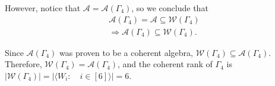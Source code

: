 However, notice that $\mathcal{A}=\mathcal{A}(\Gamma_4)$, so we conclude that
\begin{align*}
    \mathcal{A}(\Gamma_4)=\mathcal{A}\subseteq\mathcal{W}(\Gamma_4)\\
    \Rightarrow\mathcal{A}(\Gamma_4)\subseteq\mathcal{W}(\Gamma_4).
\end{align*}

Since $\mathcal{A}(\Gamma_4)$ was proven to be a coherent algebra, $\mathcal{W}(\Gamma_4)\subseteq\mathcal{A}(\Gamma_4)$.
Therefore, $\mathcal{W}(\Gamma_4)=\mathcal{A}(\Gamma_4)$, and the coherent rank of $\Gamma_4$ is $|\mathcal{W}(\Gamma_4)| = |\langle W_i:\quad i\in[6]\rangle|=6$.





